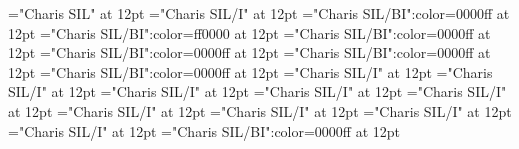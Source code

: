 \documentclass[a4paper]{article}
\begin{document}
\pagestyle{plain}
\sloppy
\setlength{\parfillskip}{0pt plus 1fil}
\font\sectionletter="Charis SIL" at 12pt
\font\articlesectionletter="Charis SIL/I" at 12pt
\font\sensearticlesectionletter="Charis SIL/BI":color=0000ff at 12pt
\font\sensebeforearticlesectionletter="Charis SIL/BI":color=ff0000 at 12pt
\font\firstoftypegrammarcategorylastoftypesensearticlesectionletter="Charis SIL/BI":color=0000ff at 12pt
\font{}="Charis SIL/BI":color=0000ff at 12pt
\font\firstoftypelastoftypewordusedefinitionfirstoftypelastoftypesensearticlesectionletter="Charis SIL/BI":color=0000ff at 12pt
\font\examplesensearticlesectionletter="Charis SIL/BI":color=0000ff at 12pt
\font\firstoftypelastoftypesubentryarticlesectionletter="Charis SIL/I" at 12pt
\font\firstoftypeheadwordlastoftypefirstoftypelastoftypesubentryarticlesectionletter="Charis SIL/I" at 12pt
\font\examplefirstoftypelastoftypesubentryarticlesectionletter="Charis SIL/I" at 12pt
\font\firstoftypeheadwordlastoftypearticlesectionletter="Charis SIL/I" at 12pt
\font\firstoftypelastoftypepronunciationarticlesectionletter="Charis SIL/I" at 12pt
\font\firstoftypelastoftypestressfirstoftypelastoftypepronunciationarticlesectionletter="Charis SIL/I" at 12pt
\font\firstoftypevariantinflectionarticlesectionletter="Charis SIL/I" at 12pt
\font\variantinflectionarticlesectionletter="Charis SIL/I" at 12pt
\font\lastoftypevariantinflectionarticlesectionletter="Charis SIL/I" at 12pt
\font\exampleusefirstoftypelastoftypesensearticlesectionletter="Charis SIL/BI":color=0000ff at 12pt

\newpage 
\thispagestyle{empty} 
\mbox{} 
\newpage 
\newpage 
\setcounter{page}{1} 
\pagestyle{fancy} 
\end{document}
